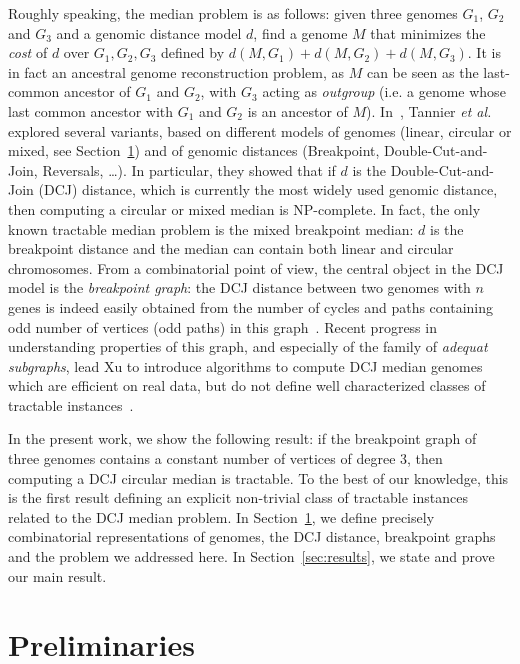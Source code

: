 \documentclass[10pt]{llncs}
\begin{document}
Roughly speaking, the median problem is as follows: given three
genomes $G_1$, $G_2$ and $G_3$ and a genomic distance model $d$, find
a genome $M$ that minimizes the \emph{cost} of $d$ over $G_1, G_2,
G_3$ defined by $d(M,G_1)+d(M,G_2)+d(M,G_3)$. It is in fact an
ancestral genome reconstruction problem, as $M$ can be seen as the
last-common ancestor of $G_1$ and $G_2$, with $G_3$ acting as {\em
  outgroup} (i.e. a genome whose last common ancestor with $G_1$ and
$G_2$ is an ancestor of $M$). In~\cite{Tannier2009}, Tannier {\em et
  al.} explored several variants, based on different models of genomes
(linear, circular or mixed, see Section~\ref{sec:prelim}) and of
genomic distances (Breakpoint, Double-Cut-and-Join, Reversals,
\dots). In particular, they showed that if $d$ is the
Double-Cut-and-Join (DCJ) distance, which is currently the most widely
used genomic distance, then computing a circular or mixed median is
NP-complete. In fact, the only known tractable median problem is the
mixed breakpoint median: $d$ is the breakpoint distance and the median
can contain both linear and circular chromosomes. From a combinatorial
point of view, the central object in the DCJ model is the {\em
  breakpoint graph}: the DCJ distance between two genomes with $n$
genes is indeed easily obtained from the number of cycles and paths
containing odd number of vertices (odd paths) in this
graph~\cite{Yancopoulos2005,Bergeron2006}. Recent progress in
understanding properties of this graph, and especially of the family
of {\em adequat subgraphs}, lead Xu to introduce algorithms to compute
DCJ median genomes which are efficient on real data, but do not define
well characterized classes of tractable
instances~\cite{Xu2008,Xu2009a,Xu2009b,Xu2011}.

In the present work, we show the following result: if the breakpoint
graph of three genomes contains a constant number of vertices of
degree 3, then computing a DCJ circular median is tractable. To the
best of our knowledge, this is the first result defining an explicit
non-trivial class of tractable instances related to the DCJ median
problem. In Section~\ref{sec:prelim}, we define precisely
combinatorial representations of genomes, the DCJ distance, breakpoint
graphs and the problem we addressed here. In
Section~\ref{sec:results}, we state and prove our main result.





\section{Preliminaries} \label{sec:prelim}
\end{document}
